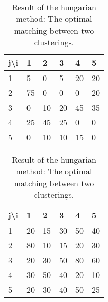 \begin{table}[h]
    \centering
    \begin{tabular}{|l | l l l l l |}
    \hline
    j\textbackslash i & 1 & 2 & 3 & 4 & 5\\ \hline
    1 & 5 & \cellcolor{blue!25}0 & 5 & 20 & 20\\
    2 & 75 & 0 & \cellcolor{blue!25}0 & 0 & 20\\
    3 & \cellcolor{blue!25}0 & 10 & 20 & 45 & 35\\
    4 & 25 & 45 & 25 & \cellcolor{blue!25}0 & 0\\
    5 & 0 & 10 & 10 & 15 & \cellcolor{blue!25}0\\ \hline
    \end{tabular}
    \begin{tabular}{|l | l l l l l|}
        \hline
        j\textbackslash i & 1 & 2 & 3 & 4 & 5\\ \hline
        1 & 20 & \cellcolor{blue!25}15 & 30 & 50 & 40\\
        2 & 80 & 10 & \cellcolor{blue!25}15 & 20 & 30\\
        3 & \cellcolor{blue!25}20 & 30 & 50 & 80 & 60\\
        4 & 30 & 50 & 40 & \cellcolor{blue!25}20 & 10\\
        5 & 20 & 30 & 40 & 50 & \cellcolor{blue!25}25\\ \hline
    \end{tabular}
    \caption{Result of the hungarian method: The optimal matching between two clusterings.}
    \label{app:hung:assignment}
\end{table}